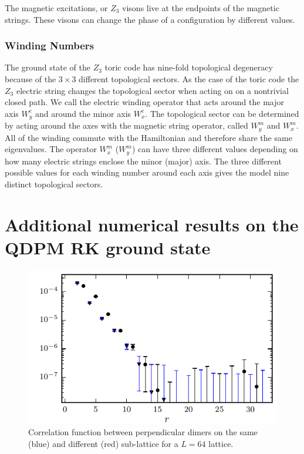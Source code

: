 \documentclass[twocolumn,prb,aps,floatfix,superscriptaddress]{revtex4-1}
\begin{document}
            The magnetic excitations, or $Z_3$ visons live at the endpoints of the magnetic
            strings.  These visons can change the phase of a configuration by different values.
            



        \subsubsection{Winding Numbers}

            The ground state of the $Z_3$ toric code has nine-fold topological degeneracy because of
            the $3\times3$ different topological sectors. As the case of the toric code the $Z_3$
            electric string changes the topological sector when acting on on a nontrivial closed
            path. We call the electric winding
            operator that acts around the major axis $W^e_y$ and around the minor axis $W^e_x$.
            The topological sector can be determined 
            by acting around the axes with the magnetic string operator, called $W^m_y$ and
            $W^m_x$. All of the winding commute with the Hamiltonian and
            therefore share the same eigenvalues. The operator $W^m_{x}$ ($W^m_{y}$) can 
            have three different values depending on how many electric strings enclose the minor
            (major) axis. The three different
            possible values for each winding number around each axis gives the model nine distinct
            topological sectors.

\section{Additional numerical results on the QDPM RK ground state}

\begin{figure}
    \centering
    \includegraphics[width=1.0\columnwidth]{spatial_cors_perp.pdf}
    \caption{Correlation function between perpendicular dimers on the same (blue) and different (red) 
    sub-lattice for a $L=64$ lattice.}
    \label{fig:spatial_dmr_cor}
\end{figure}





\end{document}
